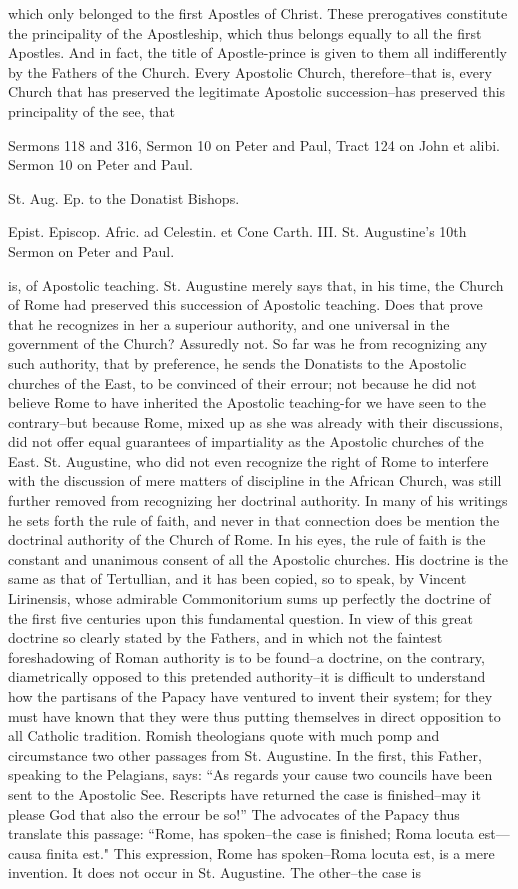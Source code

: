 which only belonged to the first Apostles of Christ. These prerogatives constitute the principality of the Apostleship, which thus belongs equally to all the first Apostles. And in fact, the title of Apostle-prince is given to them all indifferently by the Fathers of the Church. Every Apostolic Church, therefore--that is, every Church that has preserved the legitimate Apostolic succession--has preserved this principality of the see, that

Sermons 118 and 316, Sermon 10 on Peter and Paul, Tract 124 on John et alibi. Sermon 10 on Peter and Paul.

St. Aug. Ep. to the Donatist Bishops.

Epist. Episcop. Afric. ad Celestin. et Cone Carth. III. St. Augustine’s 10th Sermon on Peter and Paul.

is, of Apostolic teaching. St. Augustine merely says that, in his time, the Church of Rome had preserved this succession of Apostolic teaching. Does that prove that he recognizes in her a superiour authority, and one universal in the government of the Church? Assuredly not. So far was he from recognizing any such authority, that by preference, he sends the Donatists to the Apostolic churches of the East, to be convinced of their errour; not because he did not believe Rome to have inherited the Apostolic teaching-for we have seen to the contrary--but because Rome, mixed up as she was already with their discussions, did not offer equal guarantees of impartiality as the Apostolic churches of the East. St. Augustine, who did not even recognize the right of Rome to interfere with the discussion of mere matters of discipline in the African Church, was still further removed from recognizing her doctrinal authority. In many of his writings he sets forth the rule of faith, and never in that connection does be mention the doctrinal authority of the Church of Rome. In his eyes, the rule of faith is the constant and unanimous consent of all the Apostolic churches. His doctrine is the same as that of Tertullian, and it has been copied, so to speak, by Vincent Lirinensis, whose admirable Commonitorium sums up perfectly the doctrine of the first five centuries upon this fundamental question. In view of this great doctrine so clearly stated by the Fathers, and in which not the faintest foreshadowing of Roman authority is to be found--a doctrine, on the contrary, diametrically opposed to this pretended authority--it is difficult to understand how the partisans of the Papacy have ventured to invent their system; for they must have known that they were thus putting themselves in direct opposition to all Catholic tradition. Romish theologians quote with much pomp and circumstance two other passages from St. Augustine. In the first, this Father, speaking to the Pelagians, says: “As regards your cause two councils have been sent to the Apostolic See. Rescripts have returned the case is finished--may it please God that also the errour be so!” The advocates of the Papacy thus translate this passage: “Rome, has spoken--the case is finished; Roma locuta est—causa finita est." This expression, Rome has spoken--Roma locuta est, is a mere invention. It does not occur in St. Augustine. The other--the case is 